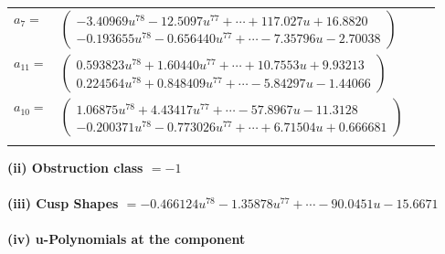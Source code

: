\documentclass[1p]{elsarticle_modified}
\theoremstyle{definition}
\begin{document}
\begin{tabular}{m{7pt} m{180pt} m{7pt} m{180pt} }
\flushright $a_{7}=$&$\begin{pmatrix}-3.40969 u^{78}-12.5097 u^{77}+\cdots+117.027 u+16.8820\\-0.193655 u^{78}-0.656440 u^{77}+\cdots-7.35796 u-2.70038\end{pmatrix}$ \\
\flushright $a_{11}=$&$\begin{pmatrix}0.593823 u^{78}+1.60440 u^{77}+\cdots+10.7553 u+9.93213\\0.224564 u^{78}+0.848409 u^{77}+\cdots-5.84297 u-1.44066\end{pmatrix}$ \\
\flushright $a_{10}=$&$\begin{pmatrix}1.06875 u^{78}+4.43417 u^{77}+\cdots-57.8967 u-11.3128\\-0.200371 u^{78}-0.773026 u^{77}+\cdots+6.71504 u+0.666681\end{pmatrix}$\\&\end{tabular}
\flushleft \textbf{(ii) Obstruction class $= -1$}\\~\\
\flushleft \textbf{(iii) Cusp Shapes $= -0.466124 u^{78}-1.35878 u^{77}+\cdots-90.0451 u-15.6671$}\\~\\
\newpage\renewcommand{\arraystretch}{1}
\flushleft \textbf{(iv) u-Polynomials at the component}\newline \\
\end{document}
